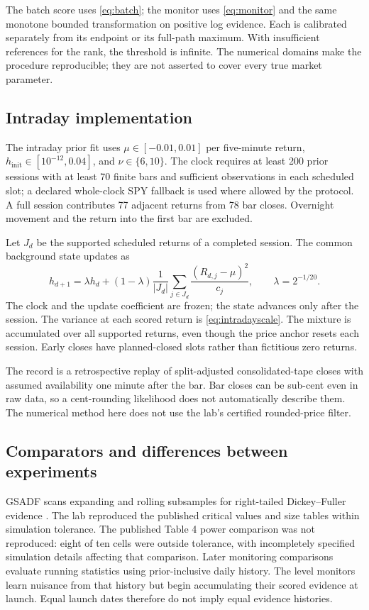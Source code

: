 The batch score uses \eqref{eq:batch}; the monitor uses
\eqref{eq:monitor} and the same monotone bounded transformation on
positive log evidence. Each is calibrated separately from its endpoint
or its full-path maximum. With insufficient references for the rank,
the threshold is infinite. The numerical domains make the procedure
reproducible; they are not asserted to cover every true market parameter.

\subsection{Intraday implementation}
The intraday prior fit uses $\mu\in[-0.01,0.01]$ per five-minute
return, $h_{\mathrm{init}}\in[10^{-12},0.04]$, and
$\nu\in\{6,10\}$. The clock requires at least 200 prior sessions
with at least 70 finite bars and sufficient observations in each
scheduled slot; a declared whole-clock SPY fallback is used where
allowed by the protocol. A full session contributes 77 adjacent
returns from 78 bar closes. Overnight movement and the return into
the first bar are excluded.

Let $J_d$ be the supported scheduled returns of a completed session.
The common background state updates as
\[
 h_{d+1}=\lambda h_d+(1-\lambda)
       \frac1{|J_d|}\sum_{j\in J_d}\frac{(R_{d,j}-\mu)^2}{c_j},
 \qquad\lambda=2^{-1/20}.
\]
The clock and the update coefficient are frozen; the state advances
only after the session. The variance at each scored return is
\eqref{eq:intradayscale}. The mixture is accumulated over all supported
returns, even though the price anchor resets each session. Early
closes have planned-closed slots rather than fictitious zero returns.

The record is a retrospective replay of split-adjusted consolidated-tape
closes with assumed availability one minute after the bar. Bar closes
can be sub-cent even in raw data, so a cent-rounding likelihood does
not automatically describe them. The numerical method here does not
use the lab's certified rounded-price filter.

\subsection{Comparators and differences between experiments}
GSADF scans expanding and rolling subsamples for right-tailed
Dickey--Fuller evidence \cite{phillips2012multiple}. The lab reproduced
the published critical values and size tables within simulation
tolerance. The published Table 4 power comparison was not reproduced:
eight of ten cells were outside tolerance, with incompletely specified
simulation details affecting that comparison. Later monitoring comparisons evaluate running
statistics using prior-inclusive daily history. The level monitors
learn nuisance from that history but begin accumulating their scored
evidence at launch. Equal launch dates therefore do not imply equal
evidence histories.

